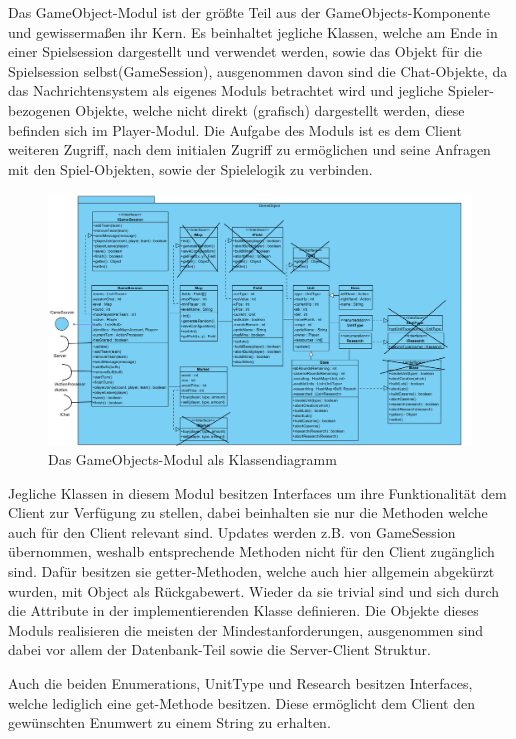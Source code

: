 \documentclass[fontsize=12pt,paper=a4,twoside]{scrartcl}
\begin{document}
Das GameObject-Modul ist der größte Teil aus der GameObjects-Komponente und gewissermaßen ihr Kern. Es beinhaltet jegliche Klassen, welche am Ende in einer Spielsession dargestellt und verwendet werden, sowie das Objekt für die Spielsession selbst(GameSession), ausgenommen davon sind die Chat-Objekte, da das Nachrichtensystem als eigenes Moduls betrachtet wird und jegliche Spieler-bezogenen Objekte, welche nicht direkt (grafisch) dargestellt werden, diese befinden sich im Player-Modul. Die Aufgabe des Moduls ist es dem Client weiteren Zugriff, nach dem initialen Zugriff zu ermöglichen und seine Anfragen mit den Spiel-Objekten, sowie der Spielelogik zu verbinden.

\begin{figure}[h]
\centering
\includegraphics[width=1.0\linewidth]{GameObjectsClass}
\caption{Das GameObjects-Modul als Klassendiagramm}
\label{fig:GameObjectsClass}
\end{figure}

Jegliche Klassen in diesem Modul besitzen Interfaces um ihre Funktionalität dem Client zur Verfügung zu stellen, dabei beinhalten sie nur die Methoden welche auch für den Client relevant sind. Updates werden z.B. von GameSession übernommen, weshalb entsprechende Methoden nicht für den Client zugänglich sind. Dafür besitzen sie getter-Methoden, welche auch hier allgemein abgekürzt wurden, mit Object als Rückgabewert. Wieder da sie trivial sind und sich durch die Attribute in der implementierenden Klasse definieren. Die Objekte dieses Moduls realisieren die meisten der Mindestanforderungen, ausgenommen sind dabei vor allem der Datenbank-Teil sowie die Server-Client Struktur.

Auch die beiden Enumerations, UnitType und Research besitzen Interfaces, welche lediglich eine get-Methode besitzen. Diese ermöglicht dem Client den gewünschten Enumwert zu einem String zu erhalten.
\end{document}
